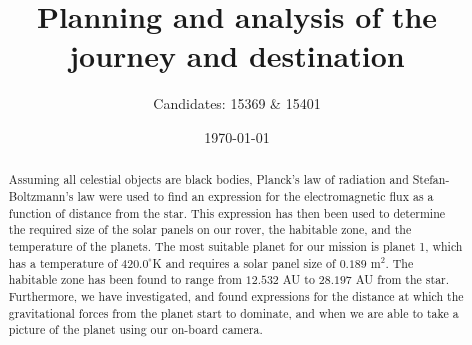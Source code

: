 \documentclass[reprint,english,notitlepage]{revtex4-2}
\begin{document}
\title{Planning and analysis of the journey and destination}
\author{Candidates: 15369 \& 15401}
\date{\today}

\begin{abstract}
	Assuming all celestial objects are black bodies, Planck's law of radiation and Stefan-Boltzmann's law were used to find an expression for the electromagnetic flux as a function of distance from the star.
	This expression has then been used to determine the required size of the solar panels on our rover, the habitable zone, and the temperature of the planets.
	The most suitable planet for our mission is planet 1, which has a temperature of $420.0^{\circ}$K and requires a solar panel size of $0.189$ m$^2$.
	The habitable zone has been found to range from $12.532$ AU to $28.197$ AU from the star.
	Furthermore, we have investigated, and found expressions for the distance at which the gravitational forces from the planet start to dominate, and when we are able to take a picture of the planet using our on-board camera.
\end{abstract}
\maketitle
\end{document}
